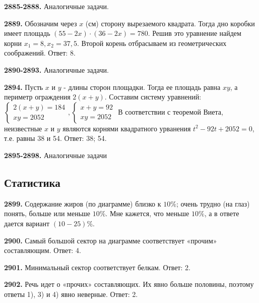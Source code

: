 \textbf{2885-2888.} Аналогичные задачи.

\textbf{2889.} Обозначим через $x$ (см) сторону вырезаемого квадрата. Тогда дно коробки имеет площадь $(55 - 2x)\cdot(36 - 2x)=780$. Решив это уравнение найдем корни $x_1=8, x_2=37,5.$ Второй корень отбрасываем из геометрических соображений. \newline \null \hspace*{\fill} Ответ: 8. 

\textbf{2890-2893.} Аналогичные задачи.

\textbf{2894.} Пусть $x$ и $y$ - длины сторон площадки. Тогда ее площадь равна $xy$, а периметр ограждения $2(x+y).$ Составим систему уравнений:\newline$
\begin{cases}
	2(x+y)=184\\
	xy=2052
\end{cases},
\begin{cases}
	x + y = 92\\
	xy=2052
\end{cases}$
В соответствии с теоремой Виета, неизвестные $x$ и $y$ являются корнями квадратного урванения $t^2 - 92t + 2052 = 0$, т.е. равны 38 и 54. \newline \null \hspace*{\fill} Ответ: 38; 54. 

\textbf{2895-2898.} Аналогичные задачи


\subsection{Статистика}

\textbf{2899.} Содержание жиров (по диаграмме) близко к $10\%$; очень трудно (на глаз) понять, больше или меньше $10\%.$ Мне кажется, что меньше $10\%$, а в ответе дается вариант  $(10-25)\%$.

\textbf{2900.} Самый большой сектор на диаграмме соответствует «прочим» составляющим. \newline \null \hspace*{\fill} Ответ: 4. 

\textbf{2901.} Минимальный сектор соответствует белкам. \newline \null \hspace*{\fill} Ответ: 2. 

\textbf{2902.} Речь идет о «прочих» составляющих. Их явно больше половины, поэтому ответы 1), 3) и 4) явно неверные. \newline \null \hspace*{\fill} Ответ: 2. 

